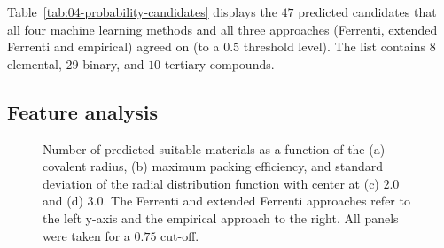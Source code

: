 \documentclass[superscriptaddress,unsortedaddress,
 amsmath,amssymb,
 aps,
]{revtex4-2}
\begin{document}



Table~\ref{tab:04-probability-candidates} displays the $47$ predicted candidates that all four machine learning methods and all three approaches (Ferrenti, extended Ferrenti and empirical) agreed on (to a $0.5$ threshold level).    
The list contains $8$ elemental, $29$ binary, and $10$ tertiary compounds.





\subsection*{Feature analysis}

\begin{figure}[ht!]
\begin{subfigure}[t]{1\textwidth}
    
\end{subfigure}
\begin{subfigure}[b]{0.45\textwidth}
    \scalebox{0.85}{}
    \subcaption{}
\end{subfigure}
\begin{subfigure}[b]{0.45\textwidth}
    \scalebox{0.85}{}
    \subcaption{}
\end{subfigure}%

\begin{subfigure}[b]{0.45\textwidth}
    \scalebox{0.85}{}
    \subcaption{}
\end{subfigure}
\begin{subfigure}[b]{0.45\textwidth}
    \scalebox{0.85}{}
    \subcaption{}
\end{subfigure}%
\caption{Number of predicted suitable materials as a function of the (a) covalent radius, (b) maximum packing efficiency, and standard deviation of the radial distribution function with center at (c) $2.0$ and (d) $3.0$. 
The Ferrenti and extended Ferrenti approaches refer to the left y-axis and the empirical approach to the right. All panels were taken for a $0.75$ cut-off. }
\label{fig:histograms_supp1}
\end{figure}
\end{document}
